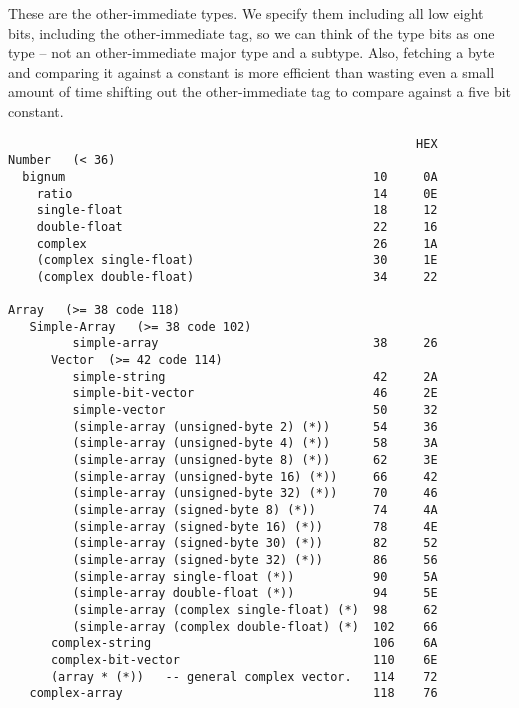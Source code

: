 \label{sec:data-blocks-and-o-i}
These are the other-immediate types.  We specify them including all low eight
bits, including the other-immediate tag, so we can think of the type bits as
one type -- not an other-immediate major type and a subtype.  Also, fetching a
byte and comparing it against a constant is more efficient than wasting even a
small amount of time shifting out the other-immediate tag to compare against a
five bit constant.
\begin{verbatim}
                                                         HEX
Number   (< 36)
  bignum                                           10     0A
    ratio                                          14     0E
    single-float                                   18     12
    double-float                                   22     16
    complex                                        26     1A
    (complex single-float)                         30     1E
    (complex double-float)                         34     22

Array   (>= 38 code 118)
   Simple-Array   (>= 38 code 102)
         simple-array                              38     26
      Vector  (>= 42 code 114)
         simple-string                             42     2A
         simple-bit-vector                         46     2E 
         simple-vector                             50     32
         (simple-array (unsigned-byte 2) (*))      54     36
         (simple-array (unsigned-byte 4) (*))      58     3A
         (simple-array (unsigned-byte 8) (*))      62     3E
         (simple-array (unsigned-byte 16) (*))     66     42
         (simple-array (unsigned-byte 32) (*))     70     46
         (simple-array (signed-byte 8) (*))        74     4A
         (simple-array (signed-byte 16) (*))       78     4E
         (simple-array (signed-byte 30) (*))       82     52
         (simple-array (signed-byte 32) (*))       86     56
         (simple-array single-float (*))           90     5A
         (simple-array double-float (*))           94     5E
         (simple-array (complex single-float) (*)  98     62
         (simple-array (complex double-float) (*)  102    66
      complex-string                               106    6A
      complex-bit-vector                           110    6E
      (array * (*))   -- general complex vector.   114    72
   complex-array                                   118    76


\end{verbatim}
